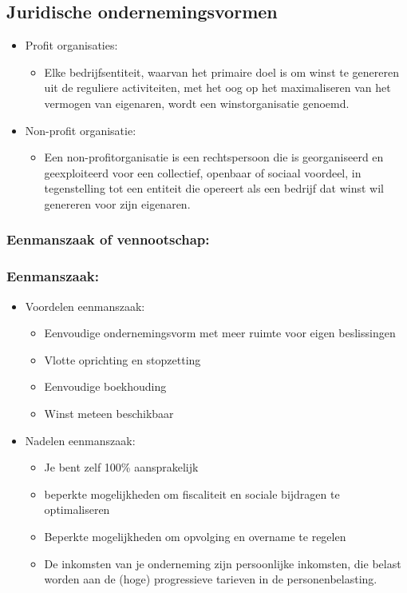 \documentclass[12pt]{article}
\begin{document}
\subsection{Juridische ondernemingsvormen}
\begin{itemize}
    \item Profit organisaties:\begin{itemize}
        \item Elke bedrijfsentiteit, waarvan het primaire doel is om winst te genereren uit de reguliere activiteiten, met het oog op het maximaliseren van het vermogen van eigenaren, wordt een winstorganisatie genoemd.
    \end{itemize}
    \item Non-profit organisatie:\begin{itemize}
        \item Een non-profitorganisatie is een rechtspersoon die is georganiseerd en geexploiteerd voor een collectief, openbaar of sociaal voordeel, in tegenstelling tot een entiteit die opereert als een bedrijf dat winst wil genereren voor zijn eigenaren.
    \end{itemize}
\end{itemize}
\subsubsection{Eenmanszaak of vennootschap:}
\subsubsection{Eenmanszaak:}
\begin{itemize}
    \item Voordelen eenmanszaak:\begin{itemize}
        \item Eenvoudige ondernemingsvorm met meer ruimte voor eigen beslissingen 
        \item Vlotte oprichting en stopzetting
        \item Eenvoudige boekhouding
        \item Winst meteen beschikbaar
    \end{itemize}
    \item Nadelen eenmanszaak:\begin{itemize}
        \item Je bent zelf 100\% aansprakelijk
        \item beperkte mogelijkheden om fiscaliteit en sociale bijdragen te optimaliseren
        \item Beperkte mogelijkheden om opvolging en overname te regelen 
        \item De inkomsten van je onderneming zijn persoonlijke inkomsten, die belast worden aan de (hoge) progressieve tarieven  in de personenbelasting.
    \end{itemize}
\end{itemize}
\end{document}
